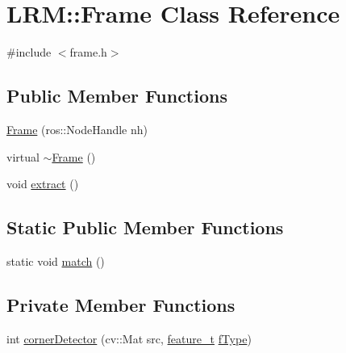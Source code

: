\hypertarget{classLRM_1_1Frame}{\section{\-L\-R\-M\-:\-:\-Frame \-Class \-Reference}
\label{classLRM_1_1Frame}
}


{\ttfamily \#include $<$frame.\-h$>$}

\subsection*{\-Public \-Member \-Functions}
\begin{DoxyCompactItemize}
\item 
\hyperlink{classLRM_1_1Frame_a636777ddefb4bdd602fba813ed415d7c}{\-Frame} (ros\-::\-Node\-Handle nh)
\item 
virtual \hyperlink{classLRM_1_1Frame_a4bc612464eb751bbefba26e7f9e6342f}{$\sim$\-Frame} ()
\item 
void \hyperlink{classLRM_1_1Frame_a9358dbaa793683ab3410b01f322f7a2a}{extract} ()
\end{DoxyCompactItemize}
\subsection*{\-Static \-Public \-Member \-Functions}
\begin{DoxyCompactItemize}
\item 
static void \hyperlink{classLRM_1_1Frame_a32abb5b5830bb7656b7234fe5ba92ef3}{match} ()
\end{DoxyCompactItemize}
\subsection*{\-Private \-Member \-Functions}
\begin{DoxyCompactItemize}
\item 
int \hyperlink{classLRM_1_1Frame_a0cbaae54e9e1ff08532b57b076a0e61e}{corner\-Detector} (cv\-::\-Mat src, \hyperlink{namespaceLRM_a8eb6956b84fb7d27bce5af771937794f}{feature\-\_\-t} \hyperlink{classLRM_1_1Frame_a4984e53e358e726cbf67a55e1cb4f01a}{f\-Type})
\end{DoxyCompactItemize}
